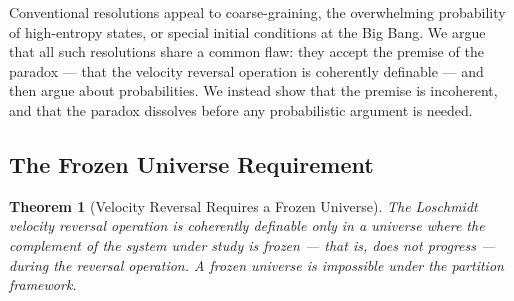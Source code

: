 \documentclass[11pt,twocolumn,a4paper]{article}
\theoremstyle{plain}
\newtheorem{theorem}{Theorem}[section]
\theoremstyle{definition}
\theoremstyle{remark}
\begin{document}
Conventional resolutions appeal to coarse-graining, the overwhelming probability
of high-entropy states, or special initial conditions at the Big Bang. We argue
that all such resolutions share a common flaw: they accept the premise of the
paradox --- that the velocity reversal operation is coherently definable --- and
then argue about probabilities. We instead show that the premise is incoherent,
and that the paradox dissolves before any probabilistic argument is needed.

\subsection{The Frozen Universe Requirement}
\label{subsec:frozen}

\begin{theorem}[Velocity Reversal Requires a Frozen Universe]
\label{thm:frozen}
The Loschmidt velocity reversal operation is coherently definable only in a
universe where the complement of the system under study is frozen --- that is,
does not progress --- during the reversal operation. A frozen universe is
impossible under the partition framework.
\end{theorem}
\end{document}
